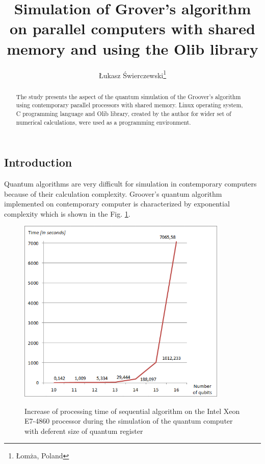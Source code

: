 \documentclass[10pt, a5paper]{article}
\begin{document}
\title{Simulation of Grover's algorithm on parallel computers with shared memory and using the Olib library}%

\author{\L{}ukasz \'{S}wierczewski\footnote{\L{}omża, Poland}}
\maketitle

\begin{abstract}
The study presents the aspect of the quantum simulation of the Groover's algorithm using contemporary parallel processors with shared memory. Linux operating system, C programming language and Olib library, created by the author for wider set of numerical calculations, were used as a programming environment.
\end{abstract}


\subsection*{Introduction}

Quantum algorithms are very difficult for simulation in contemporary computers because of their calculation complexity. Groover's quantum algorithm implemented on contemporary computer is characterized by exponential complexity which is shown in the Fig. \ref{lf1}.

\begin{figure}
  \centering
  \includegraphics[width=10cm]{18_2012_1.png}
  \label{lf1}
  \caption{Increase of processing time of sequential algorithm on the Intel Xeon E7-4860  processor during the simulation of the quantum computer with deferent size of quantum register}
\end{figure}
\end{document}
